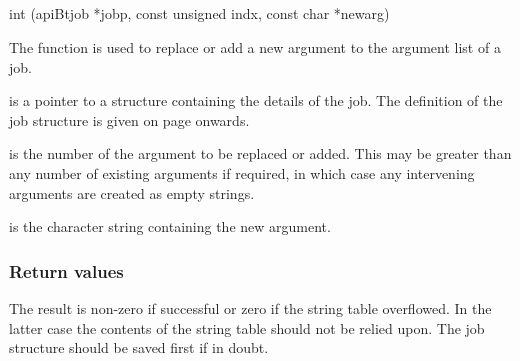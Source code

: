 \subsection{\funcnameXBputarg{}}

\begin{expara}

int \funcnameXBputarg{}(apiBtjob *jobp, const unsigned indx, const char *newarg)

\end{expara}

The function \funcXBputarg{} is used to replace or add
a new argument to the argument list of a job.

 is a pointer to a structure containing the
details of the job. The definition of the job structure is given on
page \pageref{bkm:Jobstructure} onwards.

 is the number of the argument to be replaced
or added. This may be greater than any number of existing arguments if
required, in which case any intervening arguments are created as empty
strings.

 is the character string containing the new
argument.

\subsubsection{Return values}
The result is non-zero if successful or zero if the string table
overflowed. In the latter case the contents of the string table should
not be relied upon. The job structure should be saved first if in
doubt.

